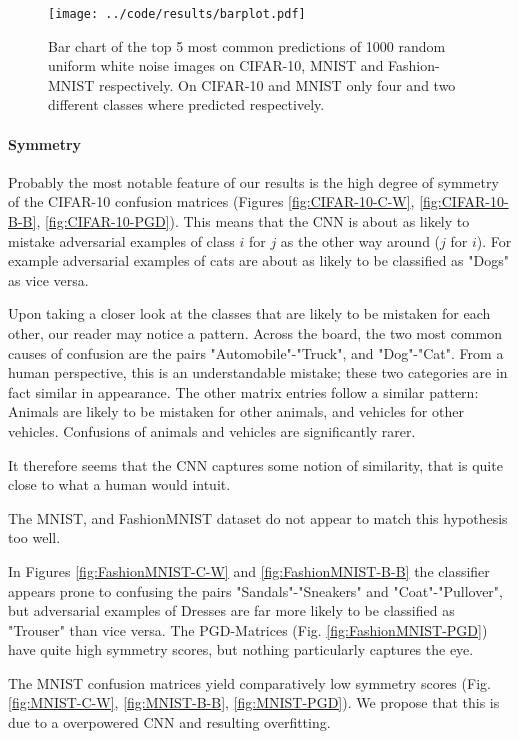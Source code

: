 \documentclass{article}
\begin{document}
\begin{figure}[t]
	\centering
	\texttt{[image: ../code/results/barplot.pdf]}
	\caption{Bar chart of the top 5 most common predictions of 1000 random uniform white noise images on CIFAR-10, MNIST and Fashion-MNIST respectively. On CIFAR-10 and MNIST only four and two different classes where predicted respectively.}
	\label{fig:barplot}
\end{figure}

\paragraph{Symmetry}
Probably the most notable feature of our results is the high degree of symmetry of the CIFAR-10 confusion matrices (Figures \ref{fig:CIFAR-10-C-W}, \ref{fig:CIFAR-10-B-B}, \ref{fig:CIFAR-10-PGD}). This means that the CNN is about as likely to mistake adversarial examples of class $i$ for $j$ as the other way around ($j$ for $i$). For example adversarial examples of cats are about as likely to be classified as "Dogs" as vice versa.

Upon taking a closer look at the classes that are likely to be mistaken for each other, our reader may notice a pattern. Across the board, the two most common causes of confusion are the pairs "Automobile"-"Truck", and "Dog"-"Cat". From a human perspective, this is an understandable mistake; these two categories are in fact similar in appearance. The other matrix entries follow a similar pattern: Animals are likely to be mistaken for other animals, and vehicles for other vehicles. Confusions of animals and vehicles are significantly rarer.

It therefore seems that the CNN captures some notion of similarity, that is quite close to what a human would intuit.
\vspace{12pt}


The MNIST, and FashionMNIST dataset do not appear to match this hypothesis too well.

In Figures \ref{fig:FashionMNIST-C-W} and \ref{fig:FashionMNIST-B-B} the classifier appears prone to confusing the pairs "Sandals"-"Sneakers" and "Coat"-"Pullover", but adversarial examples of Dresses are far more likely to be classified as "Trouser" than vice versa. The PGD-Matrices (Fig. \ref{fig:FashionMNIST-PGD}) have quite high symmetry scores, but nothing particularly captures the eye.

The MNIST confusion matrices yield comparatively low symmetry scores (Fig. \ref{fig:MNIST-C-W}, \ref{fig:MNIST-B-B}, \ref{fig:MNIST-PGD}). We propose that this is due to a overpowered CNN and resulting overfitting.
\end{document}
